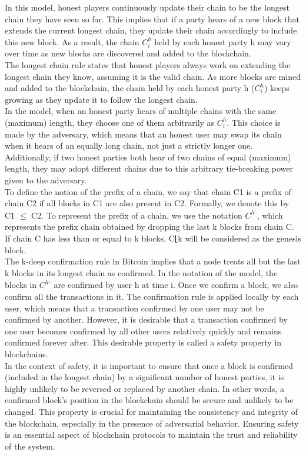 \documentclass{report}
\begin{document}
In this model, honest players continuously update their chain to be the longest chain they have seen so far. This implies that if a party hears of a new block that extends the current longest chain, they update their chain accordingly to include this new block. As a result, the chain $C_{i}^{h}$ held by each honest party h may vary over time as new blocks are discovered and added to the blockchain.\\
The longest chain rule states that honest players always work on extending the longest chain they know, assuming it is the valid chain. As more blocks are mined and added to the blockchain, the chain held by each honest party h ($C_{i}^{h}$) keeps growing as they update it to follow the longest chain.\\
In the model, when an honest party hears of multiple chains with the same (maximum) length, they choose one of them arbitrarily as $C_{i}^{h}$. This choice is made by the adversary, which means that an honest user may swap its chain when it hears of an equally long chain, not just a strictly longer one. Additionally, if two honest parties both hear of two chains of equal (maximum) length, they may adopt different chains due to this arbitrary tie-breaking power given to the adversary.\\
To define the notion of the prefix of a chain, we say that chain C1 is a prefix of chain C2 if all blocks in C1 are also present in C2. Formally, we denote this by C1 $\leq$ C2. To represent the prefix of a chain, we use the notation $C^{h^{⌊}}$, which represents the prefix chain obtained by dropping the last k blocks from chain C. If chain C has less than or equal to k blocks, C⌊k will be considered as the genesis block.\\
The k-deep confirmation rule in Bitcoin implies that a node treats all but the last k blocks in its longest chain as confirmed. In the notation of the model, the blocks in $C^{h^{⌊}}$ are confirmed by user h at time i. Once we confirm a block, we also confirm all the transactions in it. The confirmation rule is applied locally by each user, which means that a transaction confirmed by one user may not be confirmed by another. However, it is desirable that a transaction confirmed by one user becomes confirmed by all other users relatively quickly and remains confirmed forever after. This desirable property is called a safety property in blockchains.\\
In the context of safety, it is important to ensure that once a block is confirmed (included in the longest chain) by a significant number of honest parties, it is highly unlikely to be reversed or replaced by another chain. In other words, a confirmed block's position in the blockchain should be secure and unlikely to be changed. This property is crucial for maintaining the consistency and integrity of the blockchain, especially in the presence of adversarial behavior. Ensuring safety is an essential aspect of blockchain protocols to maintain the trust and reliability of the system.
\end{document}
